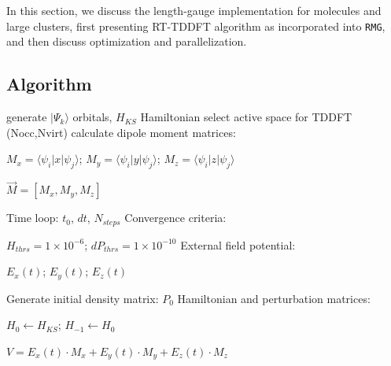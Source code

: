 \documentclass[journal=jctcce,manuscript=article,etalmode=truncate,maxauthors=10,layout=twocolumn,9pt]{achemso}   %
\begin{document}
In this section, we discuss the length-gauge implementation for molecules and large clusters, first presenting RT-TDDFT algorithm as incorporated into  \texttt{RMG}, and then  discuss optimization and parallelization.


\subsection{Algorithm}

\begin{algorithm}[h!]
\caption{Time-Dependent DFT Algorithm}
\label{alg:tddft}
\begin{algorithmic}[1] %
\scriptsize

\item[{\bf /* Ground state DFT  calculations: */ }  ]
 \State   generate $|\Psi_k\rangle$  orbitals, $H_{KS}$ Hamiltonian
 \State   select active space for TDDFT (Nocc,Nvirt)
 \State   calculate  dipole moment matrices:
 \item[]   $M_x=\langle\psi_i| x |\psi_j\rangle$;  $M_y=\langle\psi_i| y |\psi_j\rangle$;  $M_z=\langle\psi_i|z |\psi_j\rangle$
 \item[]   $\vec M = [M_x,M_y, M_z ]$
 \item[]
\item[{\bf /* Read in  parameters for RT-TDDFT: */}] 
 \State Time loop: $t_0$, $dt$, $N_{steps}$ 
 \State Convergence criteria:  
    \item[] $H_{thrs}=1\times 10^{-6}$;   $dP_{thrs}=1\times 10^{-10}$ 
 \State  External field  potential: 
    \item[]  $E_x(t)$; $E_y(t)$; $E_z(t)$ 


\item[] 
\item[{\bf /* Prepare initial  RT-TDDFT conditions: */}] 
 \State   Generate initial  density matrix: $P_0$
 \State   Hamiltonian and perturbation matrices:
    \item[]  $H_0\gets H_{KS}$;  $H_{-1}\gets H_0$
    \item[]  $V = E_x(t)\cdot M_x+E_y(t)\cdot M_y+ E_z(t)\cdot M_z$



\end{algorithmic}
\end{algorithm}
\end{document}
